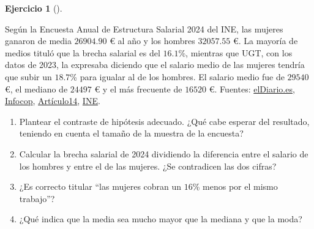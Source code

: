 \documentclass[
  spanish,
  a4paper,
]{scrreport}
\theoremstyle{definition}
\newtheorem{exercise}{Ejercicio}[chapter]
\theoremstyle{remark}
\begin{document}
\begin{exercise}[]\protect\hypertarget{exr-interpretacion-brecha-salarial}{}\label{exr-interpretacion-brecha-salarial}

Según la Encuesta Anual de Estructura Salarial 2024 del INE, las mujeres
ganaron de media \(26904.90\) € al año y los hombres \(32057.55\) €. La
mayoría de medios tituló que la brecha salarial es del \(16.1\)\%,
mientras que UGT, con los datos de 2023, la expresaba diciendo que el
salario medio de las mujeres tendría que subir un \(18.7\)\% para
igualar al de los hombres. El salario medio fue de \(29540\) €, el
mediano de \(24497\) € y el más frecuente de \(16520\) €. Fuentes:
\href{https://www.eldiario.es/1_ca4a6c}{elDiario.es},
\href{https://www.infocop.es/la-brecha-salarial-entre-hombres-y-mujeres-persiste-en-espana-ellas-ganan-de-media-un-161-menos-segun-el-ine/}{Infocop},
\href{https://www.articulo14.es/economia/por-cada-euro-que-gana-un-hombre-una-mujer-percibe-84-centimos-20250529.html}{Artículo14},
\href{https://www.ine.es/uc/u9g3Py8t}{INE}.

\begin{enumerate}
\def\labelenumi{\alph{enumi}.}
\item
  Plantear el contraste de hipótesis adecuado. ¿Qué cabe esperar del
  resultado, teniendo en cuenta el tamaño de la muestra de la encuesta?
\item
  Calcular la brecha salarial de 2024 dividiendo la diferencia entre el
  salario de los hombres y entre el de las mujeres. ¿Se contradicen las
  dos cifras?
\item
  ¿Es correcto titular ``las mujeres cobran un \(16\)\% menos por el
  mismo trabajo''?
\item
  ¿Qué indica que la media sea mucho mayor que la mediana y que la moda?
\end{enumerate}

\end{exercise}
\end{document}
